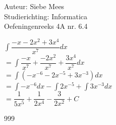 \documentclass[a4paper]{article}
\begin{document}
  
\noindent \large Auteur: Siebe Mees \\
\noindent \large Studierichting: Informatica\\
\noindent \large Oefeningenreeks 4A nr. 6.4\\

\medskip

\normalsize

$\displaystyle\int \dfrac{-x-2x^2+3x^4}{x^7} dx$\\

$ = \displaystyle\int \dfrac{-x}{x^7} + \dfrac{-2x^2}{x^7} + \dfrac{3x^4}{x^7} dx$\\

$ = \displaystyle\int (-x^{-6}-2x^{-5}+3x^{-3}) dx $\\

$ = \displaystyle\int -x^{-6}dx - \displaystyle\int 2x^{-5} + \displaystyle\int 3x^{-3} dx $\\

$ = \dfrac{1}{5x^5} + \dfrac{1}{2x^4} - \dfrac{3}{2x^2} + C $\\

\begin{thebibliography}{999}
\end{thebibliography}
\end{document}
